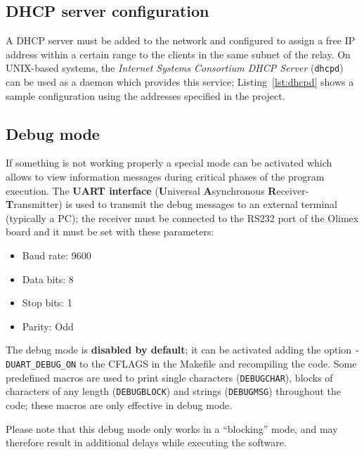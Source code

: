 \subsection{DHCP server configuration}
A DHCP server must be added to the network and configured to assign a free IP address within a certain range to the clients in the same subnet of the relay.
On UNIX-based systems, the \textit{Internet Systems Consortium DHCP Server} (\texttt{dhcpd}) can be used as a daemon which provides this service; Listing~\ref{lst:dhcpd} shows a sample configuration using the addresses specified in the project.\\


\subsection{Debug mode}
If something is not working properly a special mode can be activated which allows to view information messages during critical phases of the program execution. The \textbf{UART interface} (\textbf{U}niversal \textbf{A}synchronous \textbf{R}eceiver-\textbf{T}ransmitter) is used to transmit the debug messages to an external terminal (typically a PC); the receiver must be connected to the RS232 port of the Olimex board and it must be set with these parameters:
\begin{itemize}
	\item Baud rate: 9600
	\item Data bits: 8
	\item Stop bits: 1
	\item Parity: Odd
\end{itemize}
The debug mode is \textbf{disabled by default}; it can be activated adding the option \texttt{-DUART\_DEBUG\_ON} to the CFLAGS in the Makefile and recompiling the code. Some predefined macros are used to print single characters (\texttt{DEBUGCHAR}), blocks of characters of any length (\texttt{DEBUGBLOCK}) and strings (\texttt{DEBUGMSG}) throughout the code; these macros are only effective in debug mode.

Please note that this debug mode only works in a ``blocking'' mode, and may therefore result in additional delays while executing the software.